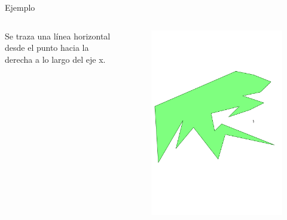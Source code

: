 \documentclass[aspectratio=169,xcolor=dvipsnames, t]{beamer}
\begin{document}
\begin{frame}{Ejemplo}
  \begin{columns}
    \begin{column}{0.3\textwidth}
      \raggedright %
      Se traza una línea horizontal desde el punto hacia la derecha a lo largo del eje x.
    \end{column}
    \begin{column}{0.7\textwidth}
      \vspace{-2.5cm} %
      \begin{figure}
        \centering
        \includegraphics[width=1\linewidth, height=.95\textheight, page=7, keepaspectratio]{IPE/point_visibility.pdf}
      \end{figure}
    \end{column}
  \end{columns}
\end{frame}
\end{document}
